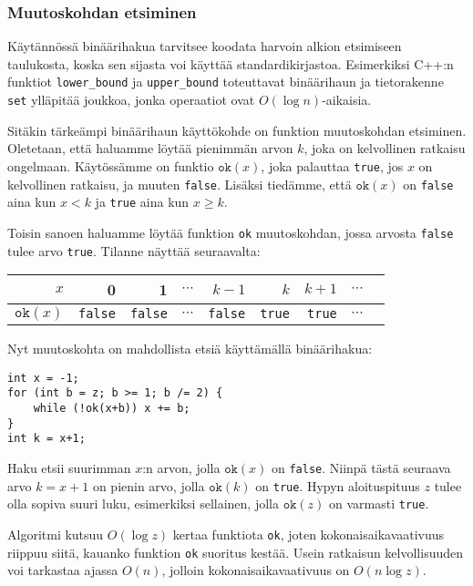 \subsubsection{Muutoskohdan etsiminen}

Käytännössä binäärihakua tarvitsee koodata
harvoin alkion etsimiseen taulukosta,
koska sen sijasta voi käyttää standardikirjastoa.
Esimerkiksi C++:n funktiot \texttt{lower\_bound}
ja \texttt{upper\_bound} toteuttavat binäärihaun
ja tietorakenne \texttt{set} ylläpitää joukkoa,
jonka operaatiot ovat $O(\log n)$-aikaisia.

Sitäkin tärkeämpi binäärihaun käyttökohde on 
funktion muutoskohdan etsiminen.
Oletetaan, että haluamme löytää pienimmän arvon $k$,
joka on kelvollinen ratkaisu ongelmaan.
Käytössämme on funktio $\texttt{ok}(x)$,
joka palauttaa \texttt{true}, jos $x$ on kelvollinen
ratkaisu, ja muuten \texttt{false}.
Lisäksi tiedämme, että $\texttt{ok}(x)$ on \texttt{false}
aina kun $x<k$ ja \texttt{true} aina kun $x \geq k$.

Toisin sanoen haluamme löytää funktion \texttt{ok} muutoskohdan,
jossa arvosta \texttt{false} tulee arvo \texttt{true}.
Tilanne näyttää seuraavalta:

\begin{center}
\begin{tabular}{r|rrrrrrrr}
$x$ & 0 & 1 & $\cdots$ & $k-1$ & $k$ & $k+1$ & $\cdots$ \\
\hline
$\texttt{ok}(x)$ & \texttt{false} & \texttt{false}
& $\cdots$ & \texttt{false} & \texttt{true} & \texttt{true} & $\cdots$ \\
\end{tabular}
\end{center}

\noindent
Nyt muutoskohta on mahdollista etsiä käyttämällä
binäärihakua:

\begin{lstlisting}
int x = -1;
for (int b = z; b >= 1; b /= 2) {
    while (!ok(x+b)) x += b;
}
int k = x+1;
\end{lstlisting}

Haku etsii suurimman $x$:n arvon,
jolla $\texttt{ok}(x)$ on \texttt{false}.
Niinpä tästä seuraava arvo $k=x+1$
on pienin arvo, jolla $\texttt{ok}(k)$ on \texttt{true}.
Hypyn aloituspituus $z$ tulee olla 
sopiva suuri luku, esimerkiksi sellainen,
jolla $\texttt{ok}(z)$ on varmasti \texttt{true}.

Algoritmi kutsuu $O(\log z)$ kertaa funktiota
\texttt{ok}, joten kokonaisaikavaativuus
riippuu siitä, kauanko funktion \texttt{ok}
suoritus kestää.
Usein ratkaisun kelvollisuuden voi tarkastaa
ajassa $O(n)$, jolloin kokonaisaikavaativuus
on $O(n \log z)$.

